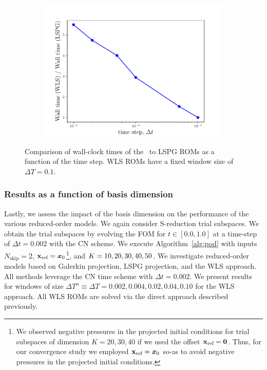 \begin{figure}
\begin{center}
\begin{subfigure}[t]{0.45\textwidth}
\includegraphics[width=1.\linewidth]{figs/sod/walltime_vs_window_dtvar.pdf}
\label{fig:sod_error_a}
\end{subfigure}
\caption{Comparison of wall-clock times of the \methodAcronymROMs\ to LSPG ROMs as a function of the time step. WLS ROMs have a fixed window size of $\Delta T = 0.1$.} 
\label{fig:walltime_dtvar}
\end{center}
\end{figure}


\subsubsection{Results as a function of basis dimension}
Lastly, we assess the impact of the basis dimension on the performance of the various reduced-order models. We again consider S-reduction trial subspaces. We obtain the trial subspaces by evolving the FOM for $t \in [0.0,1.0]$ at a time-step of $\Delta t = 0.002$ with the CN scheme. We execute Algorithm~\ref{alg:pod} with inputs $N_{\text{skip}} = 2$, $\mathbf{x}_\text{ref} = \boldsymbol x_0$\footnote{We observed negative pressures in the projected initial conditions for trial subspaces of dimension $K=20,30,40$ if we used the offset $\mathbf{x}_\text{ref} = \boldsymbol 0$. Thus, for our convergence study we employed $\mathbf{x}_\text{ref} = \boldsymbol x_0$ so-as to avoid negative pressures in the projected initial conditions.}, and $K = 10,20,30,40,50$. We investigate reduced-order models based on Galerkin projection, LSPG projection, and the WLS approach. All methods leverage the CN time scheme with $\Delta t = 0.002$. We present results for windows of size $\Delta T^n \equiv \Delta T = 0.002,0.004,0.02,0.04,0.10$ for the WLS approach. All WLS ROMs are solved via the direct approach described previously. 

